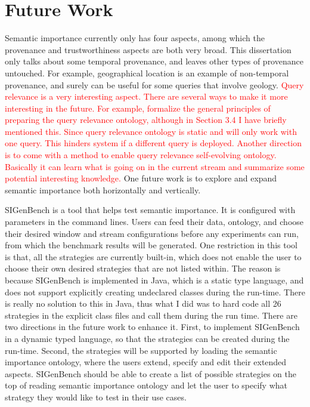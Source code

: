 \section{Future Work}
Semantic importance currently only has four aspects, among which the provenance and trustworthiness aspects are both very broad. 
This dissertation only talks about some temporal provenance, and leaves other types of provenance untouched. 
For example, geographical location is an example of non-temporal provenance, and surely can be useful for some queries that involve geology.
\textcolor{red}{
Query relevance is a very interesting aspect. 
There are several ways to make it more interesting in the future.
For example, formalize the general principles of preparing the query relevance ontology, although in Section 3.4 I have briefly mentioned this. 
Since query relevance ontology is static and will only work with one query. 
This hinders system if a different query is deployed. 
Another direction is to come with a method to enable query relevance self-evolving ontology.
Basically it can learn what is going on in the current stream and summarize some potential interesting knowledge. }
One future work is to explore and expand semantic importance both horizontally and vertically.

SIGenBench is a tool that helps test semantic importance.
It is configured with parameters in the command lines. 
Users can feed their data, ontology, and choose their desired window and stream configurations before any experiments can run, from which the benchmark results will be generated.
One restriction in this tool is that, all the strategies are currently built-in, which does not enable the user to choose their own desired strategies that are not listed within. 
The reason is because SIGenBench is implemented in Java, which is a static type language, and does not support explicitly creating undeclared classes during the run-time. 
There is really no solution to this in Java, thus what I did was to hard code all 26 strategies in the explicit class files and call them during the run time.
There are two directions in the future work to enhance it.
First, to implement SIGenBench in a dynamic typed language, so that the strategies can be created during the run-time.
Second, the strategies will be supported by loading the semantic importance ontology, where the users extend, specify and edit their extended aspects.
SIGenBench should be able to create a list of possible strategies on the top of reading semantic importance ontology and let the user to specify what strategy they would like to test in their use cases. 


